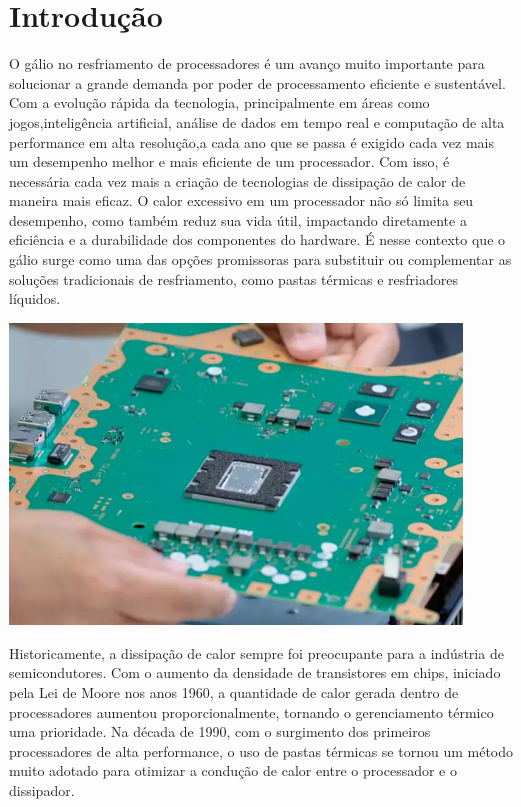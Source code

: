\documentclass{article}
\begin{document}
\tableofcontents
\newpage
\listoffigures
\newpage
{}
\nocite{*}
\section{Introdução}
O gálio no resfriamento de processadores é um avanço muito importante para solucionar a grande demanda por poder de processamento eficiente e sustentável. Com a evolução rápida da tecnologia, principalmente em áreas como jogos,inteligência artificial, análise de dados em tempo real e computação de alta performance em alta resolução,a cada ano que se passa é exigido cada vez mais um desempenho melhor e mais eficiente de um processador. 
Com isso, é necessária cada vez mais a criação de tecnologias de dissipação de calor de maneira mais eficaz. O calor excessivo em um processador não só limita seu desempenho, como também reduz sua vida útil, impactando diretamente a eficiência e a durabilidade dos componentes do hardware. É nesse contexto que o gálio surge como uma das opções promissoras para substituir ou complementar as soluções tradicionais de resfriamento, como pastas térmicas e resfriadores líquidos.
\begin{adjustbox}{center,caption={Placa Mãe do PS5 (Imagem: PlayStation/Reprodução)},nofloat=figure,vspace=\bigskipamount}
    \centering
    \includegraphics[width=12cm]{mobo.png}
\end{adjustbox}
Historicamente, a dissipação de calor sempre foi preocupante para a indústria de semicondutores. Com o aumento da densidade de transistores em chips, iniciado pela Lei de Moore nos anos 1960, a quantidade de calor gerada dentro de processadores aumentou proporcionalmente, tornando o gerenciamento térmico uma prioridade. Na década de 1990, com o surgimento dos primeiros processadores de alta performance, o uso de pastas térmicas se tornou um método muito adotado para otimizar a condução de calor entre o processador e o dissipador. 
\end{document}
